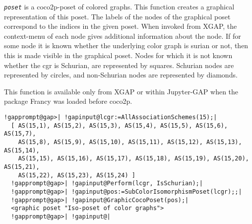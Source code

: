 \documentclass[a4paper,11pt]{report}
\begin{document}
{{{ \mbox{\texttt{\mdseries\slshape poset}} is a \textsf{coco2p}-poset of colored graphs. This function creates a graphical representation of
this poset. The labels of the nodes of the graphical poset correspond to the
indices in the given poset. When invoked from \textsf{XGAP}, the context-menu of each node gives additional information about the node.
If for some node it is known whether the underlying color graph is surian or
not, then this is made visible in the graphical poset. Nodes for which it is
not known whether the cgr is Schurian, are represented by squares. Schurian
nodes are represented by circles, and non-Schurian nodes are represented by
diamonds. 

 This function is available only from \textsf{XGAP} or within \textsf{Jupyter-GAP} when the package \textsf{Francy} was loaded before \textsf{coco2p}. 
\begin{Verbatim}[commandchars=!@|,fontsize=\small,frame=single,label=Example]
  !gapprompt@gap>| !gapinput@lcgr:=AllAssociationSchemes(15);|
  [ AS(15,1), AS(15,2), AS(15,3), AS(15,4), AS(15,5), AS(15,6), AS(15,7),
    AS(15,8), AS(15,9), AS(15,10), AS(15,11), AS(15,12), AS(15,13), AS(15,14),
    AS(15,15), AS(15,16), AS(15,17), AS(15,18), AS(15,19), AS(15,20), AS(15,21),
    AS(15,22), AS(15,23), AS(15,24) ]
  !gapprompt@gap>| !gapinput@Perform(lcgr, IsSchurian);|
  !gapprompt@gap>| !gapinput@pos:=SubColorIsomorphismPoset(lcgr);;|
  !gapprompt@gap>| !gapinput@GraphicCocoPoset(pos);|
  <graphic poset "Iso-poset of color graphs">
  !gapprompt@gap>| !gapinput@|
  	    
\end{Verbatim}
 }

 }

 }

 
\end{document}
